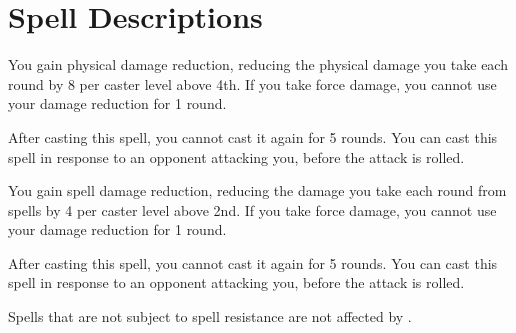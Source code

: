\section{Spell Descriptions}

\small

\begin{comment}
\subsubsection{A}
\end{comment}

\begin{spellheader}
\end{spellheader}
\begin{spelleffects}
    \spelleffect You gain physical damage reduction, reducing the physical damage you take each round by 8  per caster level above 4th. If you take force damage, you cannot use your damage reduction for 1 round.
\end{spelleffects}
\begin{spellfooter}
    \spellnotes After casting this spell, you cannot cast it again for 5 rounds. You can cast this spell in response to an opponent attacking you, before the attack is rolled.
\end{spellfooter}


\begin{spellheader}
\end{spellheader}
\begin{spelleffects}
    \spelleffect You gain spell damage reduction, reducing the damage you take each round from spells by 4  per caster level above 2nd. If you take force damage, you cannot use your damage reduction for 1 round.
\end{spelleffects}
\begin{spellfooter}
    \spellnotes After casting this spell, you cannot cast it again for 5 rounds. You can cast this spell in response to an opponent attacking you, before the attack is rolled.

    Spells that are not subject to spell resistance are not affected by .
\end{spellfooter}


